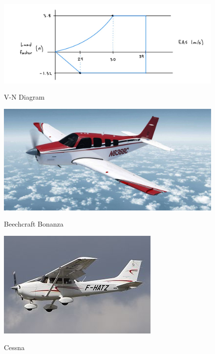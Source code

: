 \documentclass[12pt,A4paper]{article}
\begin{document}
	\begin{figure}[!h]
		\centering
		\includegraphics[width=.6\textwidth]{VN.JPG} \label{fig:f17}
		\caption{V-N Diagram}
	\end{figure}
	\begin{figure}[!h]
		\centering
		\includegraphics[width=.6\textwidth]{beechcraft.JPG} \label{fig:f15}
		\caption{Beechcraft Bonanza}
	\end{figure}
	\begin{figure}[!h]
		\centering
		\includegraphics[width=.6\textwidth]{cessna.JPG} \label{fig:f16}
		\caption{Cessna}
	\end{figure}
	
	\clearpage
\end{document}
